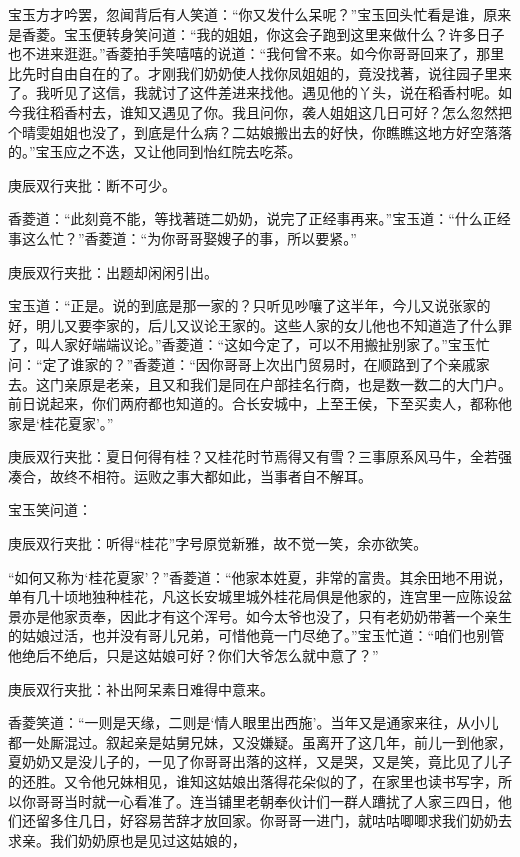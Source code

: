 \begin{parag}
    宝玉方才吟罢，忽闻背后有人笑道：“你又发什么呆呢？”宝玉回头忙看是谁，原来是香菱。宝玉便转身笑问道：“我的姐姐，你这会子跑到这里来做什么？许多日子也不进来逛逛。”香菱拍手笑嘻嘻的说道：“我何曾不来。如今你哥哥回来了，那里比先时自由自在的了。才刚我们奶奶使人找你凤姐姐的，竟没找著，说往园子里来了。我听见了这信，我就讨了这件差进来找他。遇见他的丫头，说在稻香村呢。如今我往稻香村去，谁知又遇见了你。我且问你，袭人姐姐这几日可好？怎么忽然把个晴雯姐姐也没了，到底是什么病？二姑娘搬出去的好快，你瞧瞧这地方好空落落的。”宝玉应之不迭，又让他同到怡红院去吃茶。\begin{note}庚辰双行夹批：断不可少。\end{note}香菱道：“此刻竟不能，等找著琏二奶奶，说完了正经事再来。”宝玉道：“什么正经事这么忙？”香菱道：“为你哥哥娶嫂子的事，所以要紧。”\begin{note}庚辰双行夹批：出题却闲闲引出。\end{note}宝玉道：“正是。说的到底是那一家的？只听见吵嚷了这半年，今儿又说张家的好，明儿又要李家的，后儿又议论王家的。这些人家的女儿他也不知道造了什么罪了，叫人家好端端议论。”香菱道：“这如今定了，可以不用搬扯别家了。”宝玉忙问：“定了谁家的？”香菱道：“因你哥哥上次出门贸易时，在顺路到了个亲戚家去。这门亲原是老亲，且又和我们是同在户部挂名行商，也是数一数二的大门户。前日说起来，你们两府都也知道的。合长安城中，上至王侯，下至买卖人，都称他家是‘桂花夏家’。”\begin{note}庚辰双行夹批：夏日何得有桂？又桂花时节焉得又有雪？三事原系风马牛，全若强凑合，故终不相符。运败之事大都如此，当事者自不解耳。\end{note}宝玉笑问道：\begin{note}庚辰双行夹批：听得“桂花”字号原觉新雅，故不觉一笑，余亦欲笑。\end{note}“如何又称为‘桂花夏家’？”香菱道：“他家本姓夏，非常的富贵。其余田地不用说，单有几十顷地独种桂花，凡这长安城里城外桂花局俱是他家的，连宫里一应陈设盆景亦是他家贡奉，因此才有这个浑号。如今太爷也没了，只有老奶奶带著一个亲生的姑娘过活，也并没有哥儿兄弟，可惜他竟一门尽绝了。”宝玉忙道：“咱们也别管他绝后不绝后，只是这姑娘可好？你们大爷怎么就中意了？”\begin{note}庚辰双行夹批：补出阿呆素日难得中意来。\end{note}香菱笑道：“一则是天缘，二则是‘情人眼里出西施’。当年又是通家来往，从小儿都一处厮混过。叙起亲是姑舅兄妹，又没嫌疑。虽离开了这几年，前儿一到他家，夏奶奶又是没儿子的，一见了你哥哥出落的这样，又是哭，又是笑，竟比见了儿子的还胜。又令他兄妹相见，谁知这姑娘出落得花朵似的了，在家里也读书写字，所以你哥哥当时就一心看准了。连当铺里老朝奉伙计们一群人蹧扰了人家三四日，他们还留多住几日，好容易苦辞才放回家。你哥哥一进门，就咕咕唧唧求我们奶奶去求亲。我们奶奶原也是见过这姑娘的，
\end{parag}

